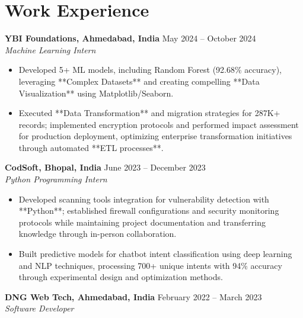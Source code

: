 \documentclass[a4paper,10pt]{article}
\begin{document}
\section*{Work Experience}
\textbf{YBI Foundations, Ahmedabad, India} \hfill May 2024 -- October 2024\\
\textit{Machine Learning Intern} \\
\begin{itemize}[leftmargin=*, itemsep=0pt, parsep=1pt]
\vspace{-6mm}
\item Developed 5+ ML models, including Random Forest (92.68\% accuracy), leveraging **Complex Datasets** and creating compelling **Data Visualization** using Matplotlib/Seaborn.
\item Executed **Data Transformation** and migration strategies for 287K+ records; implemented encryption protocols and performed impact assessment for production deployment, optimizing enterprise transformation initiatives through automated **ETL processes**.
\end{itemize}
\textbf{CodSoft, Bhopal, India} \hfill June 2023 -- December 2023\\
\textit{Python Programming Intern} \\
\begin{itemize}[leftmargin=*, itemsep=0pt, parsep=1pt]
\vspace{-6mm}
\item Developed scanning tools integration for vulnerability detection with **Python**; established firewall configurations and security monitoring protocols while maintaining project documentation and transferring knowledge through in-person collaboration.
\item Built predictive models for chatbot intent classification using deep learning and NLP techniques, processing 700+ unique intents with 94\% accuracy through experimental design and optimization methods.
\vspace{-1mm}
\end{itemize}

\textbf{DNG Web Tech, Ahmedabad, India} \hfill February 2022 -- March 2023 \\
\textit{Software Developer} \\
\end{document}
